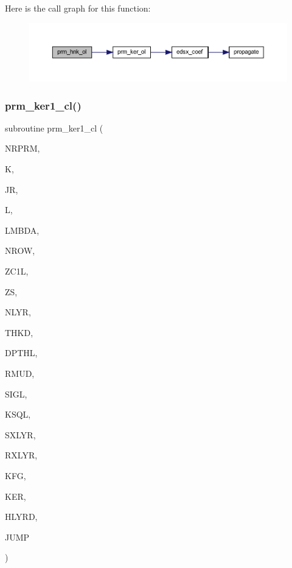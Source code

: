 Here is the call graph for this function\+:\nopagebreak
\begin{figure}[H]
\begin{center}
\leavevmode
\includegraphics[width=350pt]{Leroi__c_8f90_a89b4321e05fd2190aba745c6eec86645_cgraph}
\end{center}
\end{figure}
\mbox{\label{Leroi__c_8f90_a2ff2214d55840301662aae090b26e04d}} 
\subsubsection{\texorpdfstring{prm\+\_\+ker1\+\_\+cl()}{prm\_ker1\_cl()}}
{\footnotesize\ttfamily subroutine prm\+\_\+ker1\+\_\+cl (\begin{DoxyParamCaption}\item[{integer}]{N\+R\+P\+RM,  }\item[{integer}]{K,  }\item[{integer}]{JR,  }\item[{integer}]{L,  }\item[{real(kind=ql)}]{L\+M\+B\+DA,  }\item[{integer}]{N\+R\+OW,  }\item[{real, dimension(nrow)}]{Z\+C1L,  }\item[{real(kind=ql)}]{ZS,  }\item[{integer}]{N\+L\+YR,  }\item[{real(kind=ql), dimension (nlyr)}]{T\+H\+KD,  }\item[{real(kind=ql), dimension (nlyr)}]{D\+P\+T\+HL,  }\item[{real(kind=ql), dimension(0\+:nlyr)}]{R\+M\+UD,  }\item[{complex(kind=ql), dimension (nlyr)}]{S\+I\+GL,  }\item[{complex(kind=ql), dimension (nlyr)}]{K\+S\+QL,  }\item[{integer}]{S\+X\+L\+YR,  }\item[{integer}]{R\+X\+L\+YR,  }\item[{integer}]{K\+FG,  }\item[{complex (kind=ql), dimension(jnlo-\/nrprm\+:jnhi,3,nrow)}]{K\+ER,  }\item[{complex (kind=ql), dimension(nrprm,3,nrow)}]{H\+L\+Y\+RD,  }\item[{logical}]{J\+U\+MP }\end{DoxyParamCaption})}

